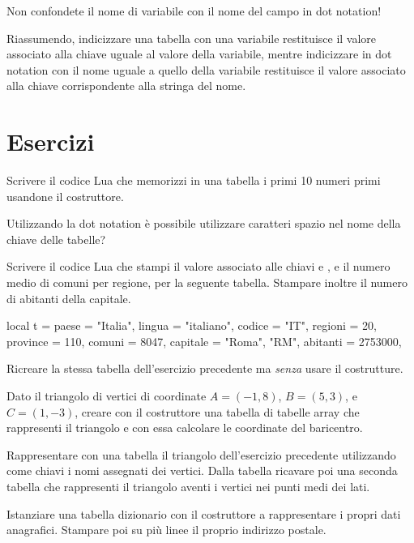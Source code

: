 Non confondete il nome di variabile con il nome del campo in dot notation!

Riassumendo, indicizzare una tabella con una variabile restituisce il valore
associato alla chiave uguale al valore della variabile, mentre indicizzare in
dot notation con il nome uguale a quello della variabile restituisce il valore
associato alla chiave corrispondente alla stringa del nome.


\section{Esercizi}

\begin{Exercise}[label={tab-01}]
Scrivere il codice Lua che memorizzi in una tabella i primi 10 numeri primi
usandone il costruttore.
\end{Exercise}

\begin{Exercise}[label={tab-02}]
Utilizzando la dot notation è possibile utilizzare caratteri spazio nel nome
della chiave delle tabelle?
\end{Exercise}

\begin{Exercise}[label={tab-03}]
Scrivere il codice Lua che stampi il valore associato alle chiavi  e
, e il numero medio di comuni per regione, per la seguente tabella.
Stampare inoltre il numero di abitanti della capitale.
\begin{lines}
local t = {
    paese = "Italia",
    lingua = "italiano",
    codice = "IT",
    regioni = 20,
    province = 110,
    comuni = 8047,
    capitale = {"Roma", "RM", abitanti = 2753000},
}
\end{lines}
\end{Exercise}

\begin{Exercise}[label={tab-04}]
Ricreare la stessa tabella  dell'esercizio precedente ma \emph{senza}
usare il costrutture.
\end{Exercise}

\begin{Exercise}[label={tab-05}]
Dato il triangolo di vertici di coordinate \( A = \left( -1, 8\right) \), \( B =
\left( 5, 3\right) \), e \( C = \left( 1, -3\right) \), creare con il
costruttore una tabella di tabelle array che rappresenti il triangolo e con essa
calcolare le coordinate del baricentro.
\end{Exercise}

\begin{Exercise}[label={tab-06}]
Rappresentare con una tabella il triangolo dell'esercizio precedente utilizzando
come chiavi i nomi assegnati dei vertici. Dalla tabella ricavare poi una seconda
tabella che rappresenti il triangolo aventi i vertici nei punti medi dei lati.
\end{Exercise}

\begin{Exercise}[label={tab-07}]
Istanziare una tabella dizionario con il costruttore a rappresentare i propri
dati anagrafici. Stampare poi su più linee il proprio indirizzo postale.
\end{Exercise}

